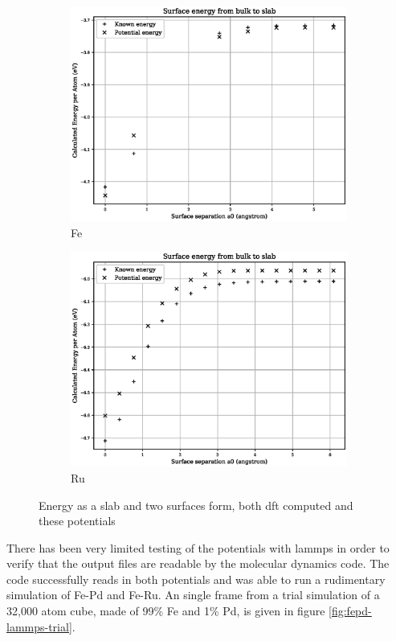 \begin{figure}[htb]
\begin{subfigure}{.48\textwidth}
  \includegraphics[width=.94\linewidth]{chapters/potentials_fe_pd_ru/feru_potential/fe_surface_energy.eps} 
  \caption{Fe}
  \label{fig:feru-fe-surface}
\end{subfigure}
\begin{subfigure}{.48\textwidth}
  \centering
  \includegraphics[width=.94\linewidth]{chapters/potentials_fe_pd_ru/feru_potential/ru_surface_energy.eps} 
  \caption{Ru}
  \label{fig:feru-ru-surface}
\end{subfigure}
\label{fig:fepd-feru-surface}
\caption{Energy as a slab and two surfaces form, both \acrshort{dft} computed and these potentials}
\end{figure}



There has been very limited testing of the potentials with \acrshort{lammps} in order to verify that the output files are readable by the molecular dynamics code.  The code successfully reads in both potentials and was able to run a rudimentary simulation of Fe-Pd and Fe-Ru.  An single frame from a trial simulation of a 32,000 atom cube, made of 99\% Fe and 1\% Pd, is given in figure \ref{fig:fepd-lammps-trial}.

